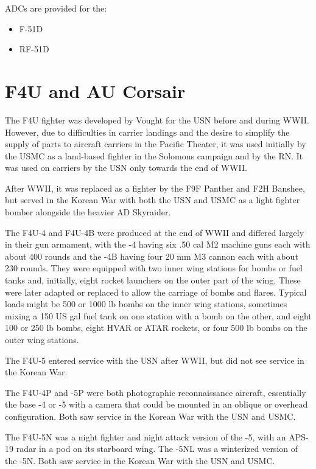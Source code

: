 ADCs are provided for the:
\begin{itemize}
\item F-51D
\item RF-51D
\end{itemize}

\section*{F4U and AU Corsair}

The F4U fighter was developed by Vought for the USN before and during WWII. However, due to difficulties in carrier landings and the desire to simplify the supply of parts to aircraft carriers in the Pacific Theater, it was used initially by the USMC as a land-based fighter in the Solomons campaign and by the RN. It was used on carriers by the USN only towards the end of WWII.

After WWII, it was replaced as a fighter by the F9F Panther and F2H Banshee, but served in the Korean War with both the USN and USMC as a light fighter bomber alongside the heavier AD Skyraider.

The F4U-4 and F4U-4B were produced at the end of WWII and differed largely in their gun armament, with the -4 having six .50 cal M2 machine guns each with about 400 rounds and the -4B having four 20 mm M3 cannon each with about 230 rounds. They were equipped with two inner wing stations for bombs or fuel tanks and, initially, eight rocket launchers on the outer part of the wing. These were later adapted or replaced to allow the carriage of bombs and flares. Typical loads might be 500 or 1000 lb bombs on the inner wing stations, sometimes mixing a 150 US gal fuel tank on one station with a bomb on the other, and eight 100 or 250 lb bombs, eight HVAR or ATAR rockets, or four 500 lb bombs on the outer wing stations.

The F4U-5 entered service with the USN after WWII, but did not see service in the Korean War.

The F4U-4P and -5P were both photographic reconnaissance aircraft, essentially the base -4 or -5 with a camera that could be mounted in an oblique or overhead configuration. Both saw service in the Korean War with the USN and USMC.

The F4U-5N was a night fighter and night attack version of the -5, with an APS-19 radar in a pod on its starboard wing. The -5NL was a winterized version of the -5N. Both saw service in the Korean War with the USN and USMC.

